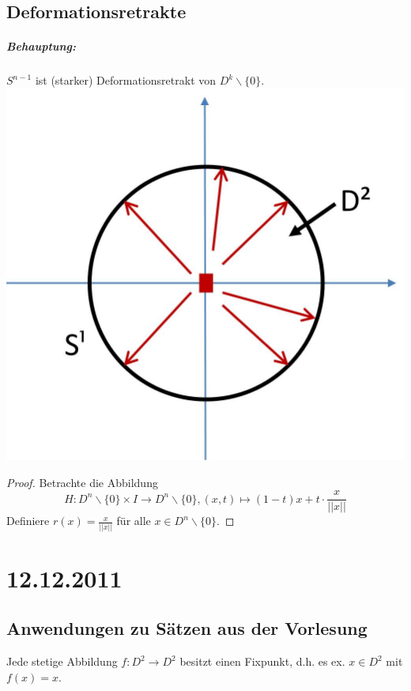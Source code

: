 \documentclass[a4paper,11pt,notitlepage]{report}
\theoremstyle{definition}
\begin{document}
\section{Deformationsretrakte}
\paragraph{Behauptung:} $S^{n-1}$ ist (starker) Deformationsretrakt von $D^k\backslash \{0\}$. \newline
\includegraphics[scale=0.4]{images/Deformationsretrakt_S1_D2.jpg}

\begin{proof}
	Betrachte die Abbildung $$H \colon D^n \backslash \{0\} \times I \rightarrow D^n \backslash \{0\}, (x,t) \mapsto (1-t)x + t \cdot \frac{x}{||x||}$$
	Definiere $r(x)= \frac{x}{||x||}$ für alle $x \in D^n \backslash \{0\}$.
\end{proof}

\chapter{12.12.2011}
\section{Anwendungen zu Sätzen aus der Vorlesung}
\begin{theorem}
	Jede stetige Abbildung $f \colon D^2 \rightarrow D^2$ besitzt einen Fixpunkt, d.h. es ex. $x \in D^2$ mit $f(x)=x$.
\end{theorem}
\end{document}
